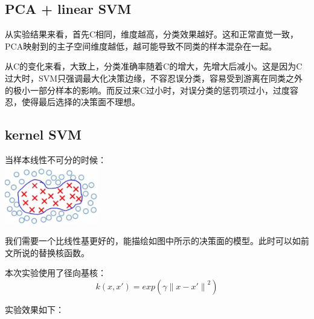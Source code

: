 \documentclass[hyperref,UTF8]{ctexart}
\begin{document}
\subsection*{PCA + linear SVM}

\begin{table}[!htbp]
  \centering
\caption{PCA降至不同维度，SVM不同C取值的分类准确率}
\label{tb:lda_knn}
\end{table}
\par 从实验结果来看，首先C相同，维度越高，分类效果越好。这和正常直觉一致，PCA映射到的主子空间维度越低，越可能导致不同类的样本混杂在一起。
\par 从C的变化来看，大致上，分类准确率随着C的增大，先增大后减小。这是因为C过大时，SVM只强调最大化决策边缘，不容忍误分类，容易受到游离在同类之外的极小一部分样本的影响。而反过来C过小时，对误分类的惩罚项过小，过度容忍，使得最后选择的决策面不理想。

\subsection*{kernel SVM}
\par 当样本线性不可分的时候：\\
\includegraphics[height=1in]{exp-results/kernel.jpg}
\par 我们需要一个比线性基更好的，能描绘如图中所示的决策面的模型。此时可以如前文所说的替换核函数。
\par 本次实验使用了径向基核：
\[k(x,x')=exp(\gamma{\|x-x'\|}^2)\]

\par 实验效果如下：
\end{document}
